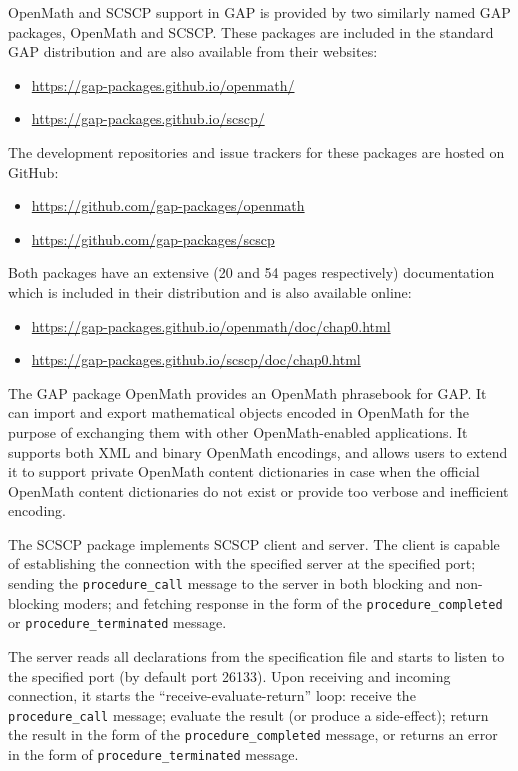 \documentclass{deliverablereport}
\begin{document}
OpenMath and SCSCP support in GAP is provided by two similarly named GAP packages, 
{\sf OpenMath} and {\sf SCSCP}. These packages are included in the 
standard GAP distribution and are also available from their 
websites:
\begin{itemize}
\item
\url{https://gap-packages.github.io/openmath/}
\item
\url{https://gap-packages.github.io/scscp/}
\end{itemize}
The development repositories and issue trackers for these packages are hosted on GitHub:
\begin{itemize}
\item
\url{https://github.com/gap-packages/openmath}
\item
\url{https://github.com/gap-packages/scscp}
\end{itemize}
Both packages have an extensive (20 and 54 pages respectively) documentation 
which is included in their distribution and is also available online:
\begin{itemize}
\item
\url{https://gap-packages.github.io/openmath/doc/chap0.html}
\item
\url{https://gap-packages.github.io/scscp/doc/chap0.html}
\end{itemize}

The GAP package OpenMath provides an OpenMath phrasebook for GAP.
It can import and export mathematical objects encoded in OpenMath
for the purpose of exchanging them with other OpenMath-enabled 
applications. It supports both XML and binary OpenMath encodings, 
and allows users to extend it to support private OpenMath content
dictionaries in case when the official OpenMath content dictionaries
do not exist or provide too verbose and inefficient encoding.

The SCSCP package implements SCSCP client and server. 
The client is capable of establishing the connection with the specified server
at the specified port; sending the {\tt procedure\_call} message to
the server in both blocking and non-blocking moders; and fetching
response in the form of the {\tt procedure\_completed} or
{\tt procedure\_terminated} message. 

The server reads all declarations from the specification file and starts
to listen to the specified port (by default port 26133). Upon receiving 
and incoming connection, it starts the ``receive-evaluate-return'' loop:
receive the {\tt procedure\_call} message; evaluate the result 
(or produce a side-effect); return the result in the form of the
{\tt procedure\_completed} message, or returns an error in the form
of {\tt procedure\_terminated} message.
\end{document}
